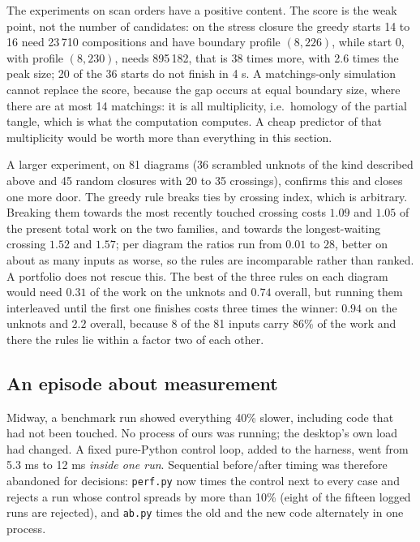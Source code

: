 The experiments on scan orders have a positive content. The score is the weak
point, not the number of candidates: on the stress closure the greedy starts
14 to 16 need 23\,710 compositions and have boundary profile $(8, 226)$, while
start 0, with profile $(8, 230)$, needs 895\,182, that is 38 times more, with
2.6 times the peak size; 20 of the 36 starts do not finish in 4 s. A
matchings-only simulation cannot replace the score, because the gap occurs at
equal boundary size, where there are at most 14 matchings: it is all
multiplicity, i.e.\ homology of the partial tangle, which is what the
computation computes. A cheap predictor of that multiplicity would be worth
more than everything in this section.

A larger experiment, on 81 diagrams (36 scrambled unknots of the kind described
above and 45 random closures with 20 to 35 crossings), confirms this and closes
one more door. The greedy rule breaks ties by crossing index, which is
arbitrary. Breaking them towards the most recently touched crossing costs
$1.09$ and $1.05$ of the present total work on the two families, and towards
the longest-waiting crossing $1.52$ and $1.57$; per diagram the ratios run from
$0.01$ to $28$, better on about as many inputs as worse, so the rules are
incomparable rather than ranked. A portfolio does not rescue this. The best of
the three rules on each diagram would need $0.31$ of the work on the unknots
and $0.74$ overall, but running them interleaved until the first one finishes
costs three times the winner: $0.94$ on the unknots and $2.2$ overall, because
8 of the 81 inputs carry 86\% of the work and there the rules lie within a
factor two of each other.

\subsection{An episode about measurement}
Midway, a benchmark run showed everything 40\% slower, including code that had
not been touched. No process of ours was running; the desktop's own load had
changed. A fixed pure-Python control loop, added to the harness, went from
5.3 ms to 12 ms \emph{inside one run}. Sequential before/after timing was
therefore abandoned for decisions: \texttt{perf.py} now times the control next
to every case and rejects a run whose control spreads by more than 10\% (eight
of the fifteen logged runs are rejected), and \texttt{ab.py} times the old and
the new code alternately in one process.

